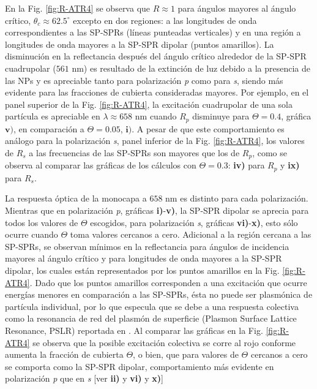 En la Fig.  \ref{fig:R-ATR4} se observa que $R\approx 1$ para ángulos mayores al ángulo crítico, $\theta_c \approx 62.5^\circ $ excepto en dos regiones: a las longitudes de onda correspondientes a las SP-SPRs (líneas punteadas verticales) y en una región a longitudes de onda mayores a la SP-SPR dipolar (puntos amarillos). La disminución en la reflectancia después del ángulo crítico alrededor de la SP-SPR cuadrupolar ($561$ nm) es resultado de la extinción de luz debido a la presencia de las NPs y es apreciable tanto para polarización \emph{p} como para \emph{s}, siendo más evidente para las fracciones de cubierta consideradas mayores. Por ejemplo, en el panel superior de la Fig. \ref{fig:R-ATR4},  la excitación cuadrupolar de una sola partícula es apreciable en $\lambda \approx 658$ nm cuando $R_p$ disminuye para $\Theta = 0.4$, gráfica  $\mathbf{v)}$, en comparación a $\Theta = 0.05$, $\mathbf{i)}$. A pesar de que este comportamiento es análogo para la polarización \emph{s}, panel inferior de la  Fig. \ref{fig:R-ATR4}, los valores de $R_s$ a las frecuencias de las SP-SPRs son mayores que los de $R_p$, como se observa al comparar las gráficas de los cálculos con $\Theta=0.3$: \textbf{iv)} para $R_p$ y \textbf{ix)} para $R_s$.

La respuesta óptica de la monocapa a $658$ nm es distinto para cada polarización. Mientras que en polarización \emph{p}, gráficas \textbf{i)}-\textbf{v)}, la SP-SPR dipolar se aprecia para todos los valores de $\Theta$ escogidos, para polarización \emph{s}, gráficas \textbf{vi)}-\textbf{x)}, esto sólo ocurre cuando $\Theta$ toma valores cercanos a cero. Adicional a la región cercana a las SP-SPRs, se observan mínimos en la reflectancia para ángulos de incidencia mayores al ángulo crítico y para longitudes de onda mayores a la SP-SPR dipolar, los cuales están  representados por los puntos amarillos en la Fig. \ref{fig:R-ATR4}. Dado que los puntos amarillos corresponden a una excitación que ocurre energías  menores en comparación a las SP-SPRs, ésta no puede ser plasmónica de partícula individual,  por lo que especula que se debe a una respuesta colectiva como la resonancia de red del plasmón de superficie (Plasmon Surface Lattice Resonance, PSLR) reportada en \cite{danilov2018ultra}. Al comparar las gráficas en la  Fig.  \ref{fig:R-ATR4} se observa que la posible excitación colectiva se corre al rojo  conforme aumenta la fracción de cubierta $\Theta$, o bien, que para valores de $\Theta$ cercanos a cero se comporta como la SP-SPR dipolar, comportamiento más evidente en polarización \emph{p} que en \emph{s} [ver \textbf{ii)} y \textbf{vi)} y \textbf{x)}]


